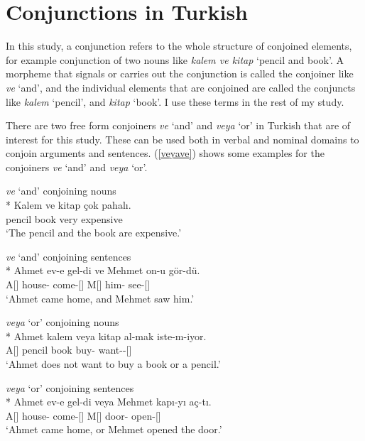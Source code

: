 \section{Conjunctions in Turkish}

In this study, a conjunction refers to the whole structure of conjoined elements, for example conjunction of two nouns like \textit{kalem ve kitap} `pencil and book'. A morpheme that signals or carries out the conjunction is called the conjoiner like \textit{ve} `and', and the individual elements that are conjoined are called the conjuncts like \textit{kalem} `pencil', and \textit{kitap} `book'. I use these terms in the rest of my study.

There are two free form conjoiners \textit{ve} `and' and \textit{veya} `or' in Turkish that are of interest for this study. These can be used both in verbal and nominal domains to conjoin arguments and sentences. (\ref{veyave}) shows some examples for the conjoiners \textit{ve} `and' and \textit{veya} `or'.

\begin{exe}
    \ex \label{veyave}
    \begin{xlist}
        \ex \textit{ve} `and' conjoining nouns\\*
        \gll Kalem ve kitap çok pahalı. \\ 
        pencil {\And} book very expensive \\
        \glt `The pencil and the book are expensive.'
        
        \ex \textit{ve} `and' conjoining sentences\\*
        \gll Ahmet ev-e gel-di ve Mehmet on-u gör-dü. \\
        A[{\Nom}] house-{\Dat} come-{\Pst}[{\Tsg}] {\And} M[{\Nom}] him-{\Acc} see-{\Pst}[{\Tsg}] \\
        \glt `Ahmet came home, and Mehmet saw him.'
    
        \ex \textit{veya} `or' conjoining nouns\\*
        \gll Ahmet kalem veya kitap al-mak iste-m-iyor. \\ 
        A[{\Nom}] pencil {\Or} book buy-{\Nmlz} want-{\Neg}-{\Prog}[{\Tsg}] \\
        \glt `Ahmet does not want to buy a book or a pencil.'
        
        \ex \textit{veya} `or' conjoining sentences\\*
        \gll Ahmet ev-e gel-di veya Mehmet kapı-yı aç-tı. \\
        A[{\Nom}] house-{\Dat} come-{\Pst}[{\Tsg}] {\Or} M[{\Nom}] door-{\Acc} open-{\Pst}[{\Tsg}] \\
        \glt `Ahmet came home, or Mehmet opened the door.'
    \end{xlist}
\end{exe}

